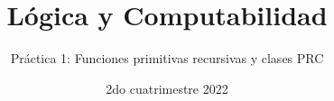 

\title{Lógica y Computabilidad}
\author{Práctica 1: Funciones primitivas recursivas y clases PRC}
\date{2do cuatrimestre 2022}



\maketitle



